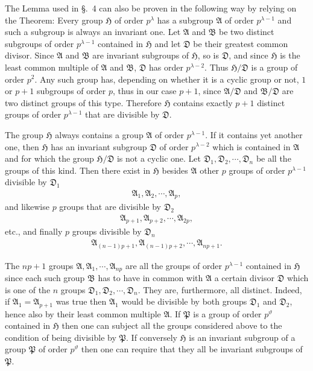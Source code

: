 \documentclass[a5paper,12pt]{article}
\let\fr\mathfrak
\newcommand{\CA}{\fr{A}}
\newcommand{\CB}{\fr{B}}
\newcommand{\CD}{\fr{D}}
\newcommand{\CH}{\fr{H}}
\newcommand{\CP}{\fr{P}}
\newcommand{\?}{{\color{blue}${}^{(?)}$}}
\newcounter{origpagecounter}{}
\newcommand{\origpagebreak}{\mark{\arabic{origpagecounter}}\addtocounter{origpagecounter}{1}\mark{\arabic{origpagecounter}}}
\begin{document}
The Lemma used in \S.~4
can also be proven 
in the following way
by relying on the Theorem:
%
%
Every group $\CH$ of order $p^\lambda$
has a subgroup $\CA$ of order $p^{\lambda-1}$
and such a subgroup
is always an invariant one.
%
%
Let $\CA$ and $\CB$ be 
two distinct subgroups of order $p^{\lambda-1}$
contained in $\CH$
and
let $\CD$ be their greatest common divisor.
%
%
Since $\CA$ and $\CB$ are invariant subgroups of $\CH$,
so is $\CD$,
and
since $\CH$ is the least common multiple of $\CA$ and $\CB$,
$\CD$ has order $p^{\lambda-2}$.
%
%
Thus
$\CH / \CD$ is a group of order $p^2$.
%
%
Any such group has,
depending on whether
it is a cyclic group or not,
$1$ or $p+1$ 
subgroups of order $p$,
thus in our case 
$p + 1$,
since $\CA / \CD$ and $\CB / \CD$
are two distinct groups of this type.
%
%
Therefore
$\CH$ contains exactly $p + 1$
distinct groups of order $p^{\lambda-1}$
that are divisible by $\CD$.


\origpagebreak


The group $\CH$ always contains
a group $\CA$ of order $p^{\lambda-1}$.
%
%
If it contains yet another one,
then
$\CH$ has an invariant subgroup $\CD$ of order $p^{\lambda-2}$
which is contained in $\CA$
and
for which the group $\CH / \CD$ is not a cyclic one.
%
%
Let $\CD_1, \CD_2, \cdots, \CD_n$
be 
all the groups of this kind.
%
%
Then there exist in $\CH$ besides $\CA$
other $p$ groups of order $p^{\lambda-1}$
divisible by $\CD_1$
\begin{align} \label{e:5-1} \tag{1.}
	\CA_1, \CA_2, \cdots, \CA_p
	,
\end{align}
and likewise
$p$ groups that are
divisible by $\CD_2$
\begin{align} \label{e:5-2} \tag{2.}
	\CA_{p+1}, \CA_{p+2}, \cdots, \CA_{2 p}
	,
\end{align}
etc.,
and finally
$p$ groups 
divisible by $\CD_n$
\begin{align} \label{e:5-3} \tag{3.}
	\CA_{(n-1) p + 1},
	\CA_{(n-1) p + 2},
	\cdots,
	\CA_{n p + 1}
	.
\end{align}


The $n p + 1$ groups
$\CA, \CA_1, \cdots, \CA_{n p}$
are all the groups of order $p^{\lambda-1}$ contained in $\CH$ 
since
each such group $\CB$ 
has to have 
in common with $\CA$
a certain divisor $\CD$
which is one of the $n$ groups $\CD_1, \CD_2, \cdots, \CD_n$.
%
%
They are, furthermore, all distinct.
%
%
Indeed,
if $\CA_1 = \CA_{p+1}$ was true
then
$\CA_1$ would be divisible by both groups $\CD_1$ and $\CD_2$,
hence also by their least common multiple $\CA$.
%
%
If $\CP$ is a group of order $p^\vartheta$
contained in $\CH$
then
one can subject all the groups considered above
to the condition
of being divisible by $\CP$.
%
%
If conversely
$\CH$ is an invariant subgroup of a group $\CP$ of order $p^\vartheta$
then
one can require
that
they all be invariant subgroups of $\CP$.
\end{document}
